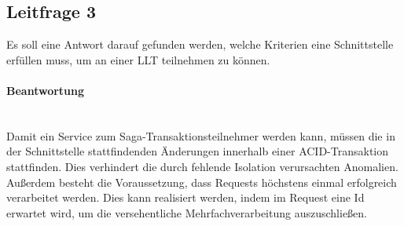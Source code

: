 \subsection{Leitfrage 3}
Es soll eine Antwort darauf gefunden werden, welche Kriterien eine Schnittstelle erfüllen muss, um an einer LLT teilnehmen zu können.

\paragraph*{Beantwortung} \mbox{} \\
Damit ein Service zum Saga-Transaktionsteilnehmer werden kann, müssen die in der Schnittstelle stattfindenden Änderungen innerhalb einer ACID-Transaktion stattfinden. Dies verhindert die durch fehlende Isolation verursachten Anomalien. Außerdem besteht die Voraussetzung, dass Requests höchstens einmal erfolgreich verarbeitet werden. Dies kann realisiert werden, indem im Request eine Id erwartet wird, um die versehentliche Mehrfachverarbeitung auszuschließen.